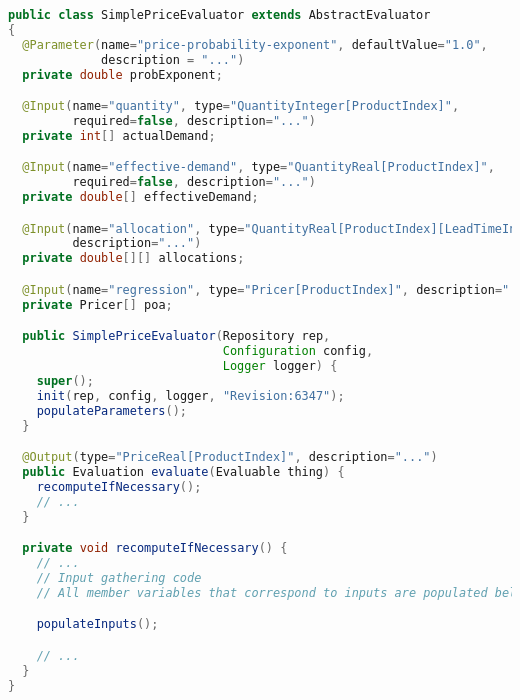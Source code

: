 \documentclass{article}
\begin{document}
{\small
\begin{lstlisting}[language={Java}]
public class SimplePriceEvaluator extends AbstractEvaluator
{
  @Parameter(name="price-probability-exponent", defaultValue="1.0",
             description = "...")
  private double probExponent;

  @Input(name="quantity", type="QuantityInteger[ProductIndex]",
         required=false, description="...")
  private int[] actualDemand;

  @Input(name="effective-demand", type="QuantityReal[ProductIndex]",
         required=false, description="...")
  private double[] effectiveDemand;

  @Input(name="allocation", type="QuantityReal[ProductIndex][LeadTimeInteger]",
         description="...")
  private double[][] allocations;

  @Input(name="regression", type="Pricer[ProductIndex]", description="...")
  private Pricer[] poa;

  public SimplePriceEvaluator(Repository rep,
                              Configuration config,
                              Logger logger) {
    super();
    init(rep, config, logger, "Revision:6347");
    populateParameters();
  }

  @Output(type="PriceReal[ProductIndex]", description="...")
  public Evaluation evaluate(Evaluable thing) {
    recomputeIfNecessary();
    // ...
  }

  private void recomputeIfNecessary() {
    // ...
    // Input gathering code
    // All member variables that correspond to inputs are populated below.

    populateInputs();

    // ...
  }
}
\end{lstlisting}
}
\end{document}
